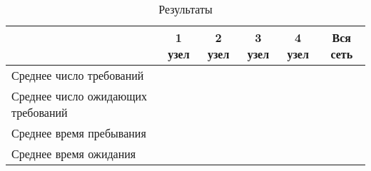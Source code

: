 \begin{table}[H]
	\begin{center}
		\caption{Результаты}
		\def\tabcolsep{8pt}
		\begin{tabular}{|C{6cm}|c|c|c|c|c|}
			\hline
			& 1 узел & 2 узел & 3 узел & 4 узел & Вся сеть \\
			\hline
			Среднее число требований &  &  &  &  & \\
			\hline
			Среднее число ожидающих требований &  &  &  &  & \\
			\hline
			Среднее время пребывания &  &  &  &  & \\
			\hline
			Среднее время ожидания &  &  &  &  & \\
			\hline	
		\end{tabular}
	\end{center}
\end{table}

